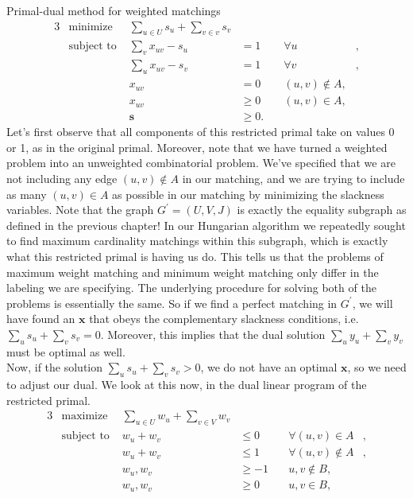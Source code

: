 \documentclass[11pt]{article}
\renewcommand{\'}{^{'}}
\begin{document}
\begin{section}{Primal-dual method for weighted matchings}
\begin{alignat}{3}
		& \text{minimize } & \sum_{u\in U} s_u + \sum_{v\in v} s_v & \\
		& \text{subject to } & \sum_v x_{uv} - s_u & = 1 & \quad \forall u &, \\
				     && \sum_u x_{uv} - s_v & = 1 & \quad \forall v &, \\
				     && x_{uv} & = 0 & \quad (u,v)\notin A, \\
				     && x_{uv} & \geq 0 & \quad (u,v)\in A, \\
				     && \mathbf{s} & \geq 0.
	\end{alignat}
	Let's first observe that all components of this restricted primal take on values 0 or 1, as 
	in the original primal. Moreover, note that we have turned a weighted problem into an 
	unweighted combinatorial problem. We've specified that we are not including any edge 
	$(u,v)\notin A$ in our matching, and we are trying to include as many $(u,v)\in A$ as possible 
	in our matching by minimizing the slackness variables. Note that the graph $G^{'} = (U,V,J)$ 
	is exactly the equality subgraph as defined in the previous chapter! In our Hungarian algorithm 
	we repeatedly sought to find maximum cardinality matchings within this subgraph, which is 
	exactly what this restricted primal is having us do. This tells us that the problems of maximum 
	weight matching and minimum weight matching only differ in the labeling we are specifying. The 
	underlying procedure for solving both of the problems is essentially the same. So if we find a 
	perfect matching in $G^{'}$, we will have found an $\mathbf{x}$ that obeys the complementary 
	slackness conditions, i.e. $\sum_u s_u + \sum_v s_v = 0$. Moreover, this implies that the 
	dual solution $\sum_u y_u + \sum_v y_v$ must be optimal as well.\\
	Now, if the solution $\sum_u s_u + \sum_v s_v > 0$, we do not have an optimal $\mathbf{x}$, 
	so we need to adjust our dual. We look at this now, in the dual linear program of the 
	restricted primal.
	\begin{alignat}{3}
		& \text{maximize } & \sum_{u\in U} w_u + \sum_{v\in V} w_v & \\
		& \text{subject to } & w_u + w_v & \leq 0 & \quad \forall (u,v)\in A &, \\
				     && w_u + w_v & \leq 1 & \quad \forall (u,v)\notin A &, \\
				     && w_u,w_v & \geq -1 & \quad u,v\notin B, \\
				     && w_u,w_v & \geq 0 & \quad u,v\in B, \\

\end{alignat}
\end{section}
\end{document}
